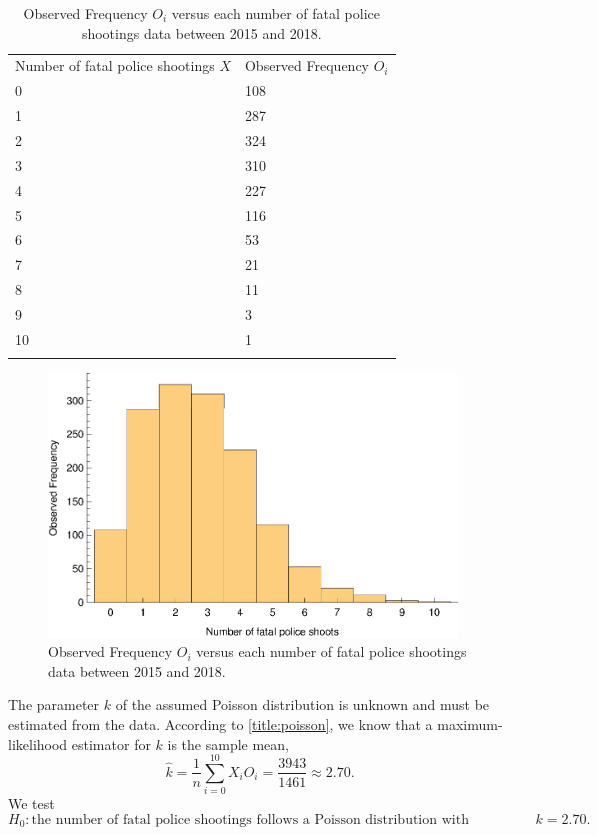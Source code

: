 \documentclass[conf]{new-aiaa}
\begin{document}
\begin{table}[!htbp]
\centering
\begin{tabular}{m{3cm}<{\centering}m{3cm}<{\centering}}
\toprule 
\toprule
Number of fatal police shootings $X$    & Observed Frequency $O_i$ \\
\noalign{\smallskip}\hline\noalign{\smallskip}
0  &   108    \\
1  &   287   \\
2  &   324    \\
3  &   310    \\
4  &   227    \\
5  &   116    \\
6  &   53    \\
7  &   21    \\
8  &   11    \\
9  &   3    \\
10  &  1     \\
\bottomrule 
\bottomrule\smallskip
\end{tabular}
\caption{Observed Frequency $O_i$ versus each number of fatal police shootings data between 2015 and 2018.}
\label{tab:q3-all-obs}
\end{table}

\begin{figure}[!htbp]
\centering
\includegraphics[height=7cm]{q3/q3-all-obs.eps}
\caption{Observed Frequency $O_i$ versus each number of fatal police shootings data between 2015 and 2018.}
\label{fig:q3-all-obs}
\end{figure}

The parameter $k$ of the assumed Poisson distribution is unknown and must be estimated from the data. According to \ref{title:poisson}, we know that a maximum-likelihood estimator for $k$ is the sample mean,
$$\hat{k} = \frac{1}{n}\sum_{i=0}^{10} X_iO_i = \frac{3943}{1461} \approx 2.70.$$
We test 
$$H_0:\text{the number of fatal police shootings follows a Poisson\ distribution with parameter }k = 2.70.$$
\end{document}

